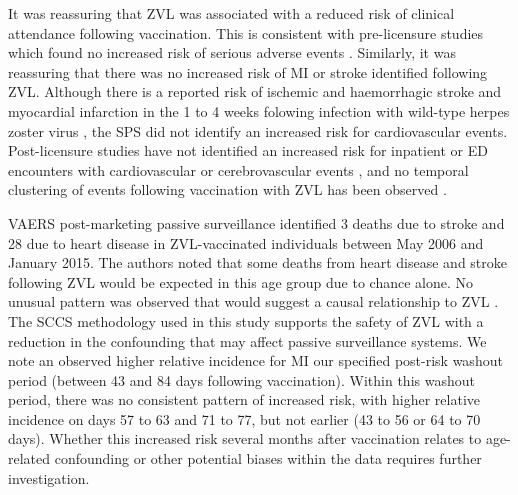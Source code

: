 \documentclass[review, endfloat]{elsarticle}
\begin{document}
It was reassuring that ZVL was associated with a reduced risk of clinical attendance following vaccination. This is consistent with pre-licensure studies which found no increased risk of serious adverse events \citep{oxman2005, gagliardi2016vaccines, schmader2012}. Similarly, it was reassuring that there was no increased risk of MI or stroke identified following ZVL. Although there is a reported risk of ischemic  and haemorrhagic stroke and myocardial infarction \citep{minassian2015, schink2016} in the 1 to 4 weeks folowing infection with wild-type herpes zoster virus \citep{gilden2009}, the SPS did not identify an increased risk for cardiovascular events. Post-licensure studies have not identified an increased risk for inpatient or ED encounters with cardiovascular or cerebrovascular events \citep{tseng2012}, and no temporal clustering of events following vaccination with ZVL has been observed \citep{baxter2012}.

VAERS post-marketing passive surveillance identified 3 deaths due to stroke and 28 due to heart disease in ZVL-vaccinated individuals between May 2006 and January 2015. The authors noted that some deaths from heart disease and stroke following ZVL would be expected in this age group due to chance alone. No unusual pattern was observed that would suggest a causal relationship to ZVL \citep{miller2018post}. The SCCS methodology used in this study supports the safety of ZVL with a reduction in the confounding that may affect passive surveillance systems. We note an observed higher relative incidence for MI our specified post-risk washout period (between 43 and 84 days following vaccination). Within this washout period, there was no consistent pattern of increased risk, with higher relative incidence on days 57 to 63 and 71 to 77, but not earlier (43 to 56 or 64 to 70 days). Whether this increased risk several months after vaccination relates to age-related confounding or other potential biases within the data requires further investigation. 
\end{document}
